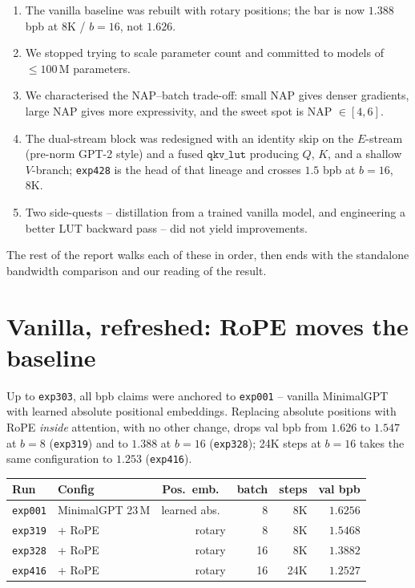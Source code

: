 \documentclass[11pt]{article}
\begin{document}
\begin{enumerate}[itemsep=1pt, topsep=2pt]
\item The vanilla baseline was rebuilt with rotary positions; the bar is now $1.388$ bpb at 8K / $b{=}16$, not $1.626$.
\item We stopped trying to scale parameter count and committed to models of $\le 100$\,M parameters.
\item We characterised the NAP--batch trade-off: small NAP gives denser gradients, large NAP gives more expressivity, and the sweet spot is NAP $\in [4, 6]$.
\item The dual-stream block was redesigned with an identity skip on the $E$-stream (pre-norm GPT-2 style) and a fused $\mathtt{qkv\_lut}$ producing $Q$, $K$, and a shallow $V$-branch; \texttt{exp428} is the head of that lineage and crosses $1.5$ bpb at $b{=}16$, 8K.
\item Two side-quests -- distillation from a trained vanilla model, and engineering a better LUT backward pass -- did not yield improvements.
\end{enumerate}
The rest of the report walks each of these in order, then ends with the standalone bandwidth comparison and our reading of the result.

\section{Vanilla, refreshed: RoPE moves the baseline}
\label{sec:rope}

Up to \texttt{exp303}, all bpb claims were anchored to \texttt{exp001} -- vanilla MinimalGPT with learned absolute positional embeddings.
Replacing absolute positions with RoPE \emph{inside} attention, with no other change, drops val bpb from $1.626$ to $1.547$ at $b{=}8$ (\texttt{exp319}) and to $\mathbf{1.388}$ at $b{=}16$ (\texttt{exp328}); 24K steps at $b{=}16$ takes the same configuration to $1.253$ (\texttt{exp416}).

\begin{center}\small
\begin{tabular}{llrrrr}
\toprule
Run & Config & Pos.\ emb.\ & batch & steps & val bpb \\
\midrule
\texttt{exp001} & MinimalGPT 23\,M & learned abs.\ & 8  & 8K  & $1.6256$ \\
\texttt{exp319} & + RoPE           & rotary        & 8  & 8K  & $1.5468$ \\
\texttt{exp328} & + RoPE           & rotary        & 16 & 8K  & $\mathbf{1.3882}$ \\
\texttt{exp416} & + RoPE           & rotary        & 16 & 24K & $\mathbf{1.2527}$ \\
\bottomrule
\end{tabular}
\end{center}
\end{document}

